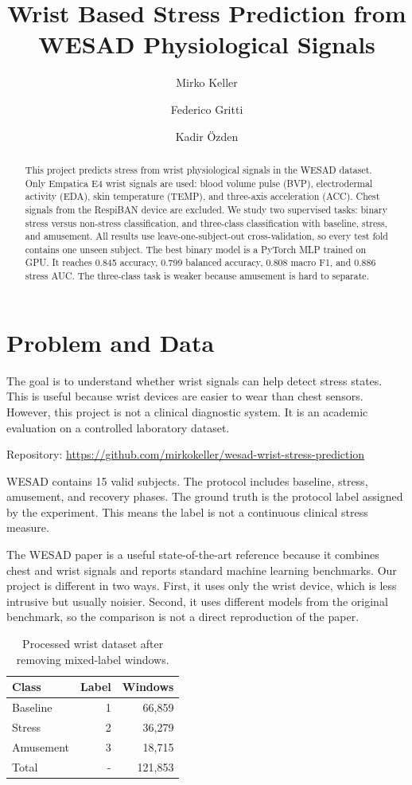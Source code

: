 \documentclass[10pt,a4paper,twocolumn]{article}
\title{\vspace{-1.2cm}\textbf{Wrist Based Stress Prediction from WESAD Physiological Signals}}
\author{Mirko Keller \and Federico Gritti \and Kadir {\"O}zden}
\date{}
\begin{document}
\maketitle
\vspace{-0.8cm}

\begin{abstract}
This project predicts stress from wrist physiological signals in the WESAD dataset. Only Empatica E4 wrist signals are used: blood volume pulse (BVP), electrodermal activity (EDA), skin temperature (TEMP), and three-axis acceleration (ACC). Chest signals from the RespiBAN device are excluded. We study two supervised tasks: binary stress versus non-stress classification, and three-class classification with baseline, stress, and amusement. All results use leave-one-subject-out cross-validation, so every test fold contains one unseen subject. The best binary model is a PyTorch MLP trained on GPU. It reaches 0.845 accuracy, 0.799 balanced accuracy, 0.808 macro F1, and 0.886 stress AUC. The three-class task is weaker because amusement is hard to separate.
\end{abstract}

\section{Problem and Data}

The goal is to understand whether wrist signals can help detect stress states. This is useful because wrist devices are easier to wear than chest sensors. However, this project is not a clinical diagnostic system. It is an academic evaluation on a controlled laboratory dataset.

Repository: \url{https://github.com/mirkokeller/wesad-wrist-stress-prediction}

WESAD contains 15 valid subjects. The protocol includes baseline, stress, amusement, and recovery phases. The ground truth is the protocol label assigned by the experiment. This means the label is not a continuous clinical stress measure.

The WESAD paper is a useful state-of-the-art reference because it combines chest and wrist signals and reports standard machine learning benchmarks. Our project is different in two ways. First, it uses only the wrist device, which is less intrusive but usually noisier. Second, it uses different models from the original benchmark, so the comparison is not a direct reproduction of the paper.

\begin{table}[t]
\centering
\caption{Processed wrist dataset after removing mixed-label windows.}
\label{tab:data}
\small
\begin{tabular}{@{}lrr@{}}
\toprule
Class & Label & Windows \\
\midrule
Baseline & 1 & 66,859 \\
Stress & 2 & 36,279 \\
Amusement & 3 & 18,715 \\
\midrule
Total & - & 121,853 \\
\bottomrule
\end{tabular}
\end{table}
\end{document}
